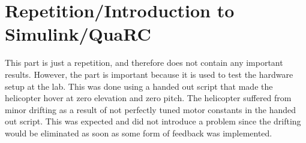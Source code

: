 \section{Repetition/Introduction to Simulink/QuaRC}\label{sec:prob1}

This part is just a repetition, and therefore does not contain any important results. However, the part is important because it is used to test the hardware setup at the lab. This was done using a handed out script that made the helicopter hover at zero elevation and zero pitch. The helicopter suffered from minor drifting as a result of not perfectly tuned motor constants in the handed out script. This was expected and did not introduce a problem since the drifting would be eliminated as soon as some form of feedback was implemented.